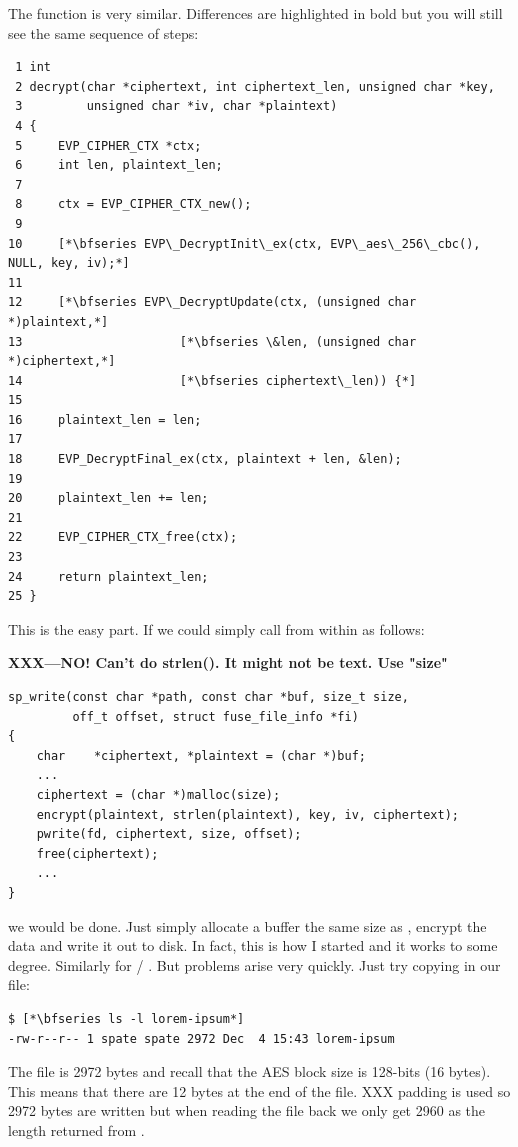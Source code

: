 The  function is very similar. Differences are highlighted in bold but you will still see the same sequence of steps:

\begin{lstlisting}
 1 int
 2 decrypt(char *ciphertext, int ciphertext_len, unsigned char *key,
 3         unsigned char *iv, char *plaintext)
 4 {
 5     EVP_CIPHER_CTX *ctx;
 6     int len, plaintext_len;
 7  
 8     ctx = EVP_CIPHER_CTX_new();
 9  
10     [*\bfseries EVP\_DecryptInit\_ex(ctx, EVP\_aes\_256\_cbc(), NULL, key, iv);*]
11  
12     [*\bfseries EVP\_DecryptUpdate(ctx, (unsigned char *)plaintext,*]
13                      [*\bfseries \&len, (unsigned char *)ciphertext,*]
14                      [*\bfseries ciphertext\_len)) {*]
15  
16     plaintext_len = len;
17  
18     EVP_DecryptFinal_ex(ctx, plaintext + len, &len);
19  
20     plaintext_len += len;
21  
22     EVP_CIPHER_CTX_free(ctx);
23 
24     return plaintext_len;
25 }
\end{lstlisting}

\noindent
This is the easy part. If we could simply call  from within  as follows:

\textbf{XXX---NO! Can't do strlen(). It might not be text. Use "size"}

\begin{lstlisting}
sp_write(const char *path, const char *buf, size_t size, 
         off_t offset, struct fuse_file_info *fi)
{
    char    *ciphertext, *plaintext = (char *)buf;
    ...    
    ciphertext = (char *)malloc(size);
    encrypt(plaintext, strlen(plaintext), key, iv, ciphertext);
    pwrite(fd, ciphertext, size, offset);
    free(ciphertext);
    ...
}
\end{lstlisting}

\noindent
we would be done. Just simply allocate a buffer the same size as , encrypt the data and write it out to disk. In fact, this is how I started and it works to some degree. Similarly for  / . But problems arise very quickly. Just try copying in our  file:

\begin{lstlisting}
$ [*\bfseries ls -l lorem-ipsum*]
-rw-r--r-- 1 spate spate 2972 Dec  4 15:43 lorem-ipsum
\end{lstlisting}

\noindent
The file is 2972 bytes and recall that the AES block size is 128-bits (16 bytes). This means that there are 12 bytes at the end of the file. XXX padding is used so 2972 bytes are written but when reading the file back we only get 2960 as the length returned from . 

